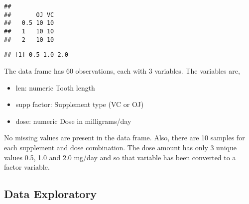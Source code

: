 \documentclass[
]{article}
\newenvironment{Shaded}{\begin{snugshade}}{\end{snugshade}}
\newcommand{\CommentTok}[1]{\textcolor[rgb]{0.56,0.35,0.01}{\textit{#1}}}
\newcommand{\FunctionTok}[1]{\textcolor[rgb]{0.00,0.00,0.00}{#1}}
\newcommand{\NormalTok}[1]{#1}
\newcommand{\OtherTok}[1]{\textcolor[rgb]{0.56,0.35,0.01}{#1}}
\newcommand{\SpecialCharTok}[1]{\textcolor[rgb]{0.00,0.00,0.00}{#1}}
\begin{document}
\begin{Shaded}
\end{Shaded}

\begin{verbatim}
##      
##       OJ VC
##   0.5 10 10
##   1   10 10
##   2   10 10
\end{verbatim}

\begin{Shaded}
\end{Shaded}

\begin{verbatim}
## [1] 0.5 1.0 2.0
\end{verbatim}

\begin{Shaded}
\end{Shaded}

The data frame has 60 observations, each with 3 variables. The variables
are,

\begin{itemize}
\item
  len: numeric Tooth length
\item
  supp factor: Supplement type (VC or OJ)
\item
  dose: numeric Dose in milligrams/day
\end{itemize}

No missing values are present in the data frame. Also, there are 10
samples for each supplement and dose combination. The dose amount has
only 3 unique values 0.5, 1.0 and 2.0 mg/day and so that variable has
been converted to a factor variable.

\hypertarget{data-exploratory}{%
\subsection{Data Exploratory}\label{data-exploratory}}
\end{document}
